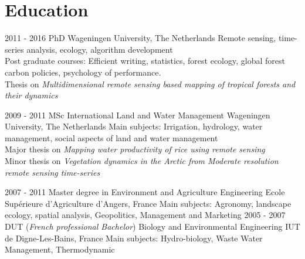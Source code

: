 \documentclass[]{friggeri-cv}
\begin{document}
\section{Education}
\begin{entrylist}
  \entry
    {2011 - 2016}
    {PhD}
    {Wageningen University, The Netherlands}
    {Remote sensing, time-series analysis, ecology, algorithm development\\
    Post graduate courses: Efficient writing, statistics, forest ecology, global forest carbon policies, psychology of performance.\\
    Thesis on \emph{Multidimensional remote sensing based mapping of tropical forests and their dynamics}\\}

  \entry
    {2009 - 2011}
    {MSc International Land and Water Management}
    {Wageningen University, The Netherlands}
    {Main subjects: Irrigation, hydrology, water management, social aspects of land and water management \\
    Major thesis on \emph{Mapping water productivity of rice using remote sensing}\\
    Minor thesis on \emph{Vegetation dynamics in the Arctic from Moderate resolution remote sensing time-series}\\}
\end{entrylist}

\begin{entrylist}
  \entry
    {2007 - 2011}
    {Master degree in Environment and Agriculture Engineering}
    {Ecole Supérieure d'Agriculture d'Angers, France}
    {Main subjects: Agronomy, landscape ecology, spatial analysis, Geopolitics, Management and Marketing}
  \entry
    {2005 - 2007}
    {DUT (\textit{French professional Bachelor}) Biology and Environmental Engineering}
    {IUT de Digne-Les-Bains, France}
    {Main subjects: Hydro-biology, Waste Water Management, Thermodynamic}
\end{entrylist}
\end{document}
